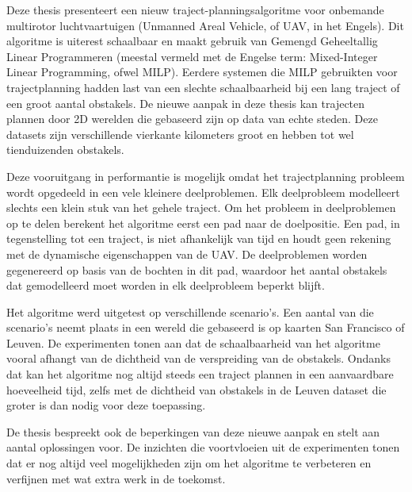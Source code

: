 \documentclass[
master=cws,
masteroption=ai,
english,
]{kulemt}
\begin{document}
\begin{abstract*}
Deze thesis presenteert een nieuw traject-planningsalgoritme voor onbemande multirotor luchtvaartuigen (Unmanned Areal Vehicle, of UAV, in het Engels). Dit algoritme is uiterest schaalbaar en maakt gebruik van Gemengd  Geheeltallig Linear Programmeren (meestal vermeld met de Engelse term: Mixed-Integer Linear Programming, ofwel MILP). Eerdere systemen die MILP gebruikten voor trajectplanning hadden last van een slechte schaalbaarheid bij een lang traject of een groot aantal obstakels. De nieuwe aanpak in deze thesis kan trajecten plannen door 2D werelden die gebaseerd zijn op data van echte steden. Deze datasets zijn verschillende vierkante kilometers groot en hebben tot wel tienduizenden obstakels.
\par
Deze vooruitgang in performantie is mogelijk omdat het trajectplanning probleem wordt opgedeeld in een vele kleinere deelproblemen. Elk deelprobleem modelleert slechts een klein stuk van het gehele traject. Om het probleem in deelproblemen op te delen berekent het algoritme eerst een pad naar de doelpositie. Een pad, in tegenstelling tot een traject, is niet afhankelijk van tijd en houdt geen rekening met de dynamische eigenschappen van de UAV. De deelproblemen worden gegenereerd op basis van de bochten in dit pad, waardoor het aantal obstakels dat gemodelleerd moet worden in elk deelprobleem beperkt blijft.
\par
Het algoritme werd uitgetest op verschillende scenario's. Een aantal van die scenario's neemt plaats in een wereld die gebaseerd is op kaarten San Francisco of Leuven. De experimenten tonen aan dat de schaalbaarheid van het algoritme vooral afhangt van de dichtheid van de verspreiding van de obstakels. Ondanks dat kan het algoritme nog altijd steeds een traject plannen in een aanvaardbare hoeveelheid tijd, zelfs met de dichtheid van obstakels in de Leuven dataset die groter is dan nodig voor deze toepassing.
\par
De thesis bespreekt ook de beperkingen van deze nieuwe aanpak en stelt aan aantal oplossingen voor. De inzichten die voortvloeien uit de experimenten tonen dat er nog altijd veel mogelijkheden zijn om het algoritme te verbeteren en verfijnen met wat extra werk in de toekomst.
\end{abstract*}

\listoffigures
\listoftables

\mainmatter

\clearpage

\clearpage

\clearpage

\clearpage

\clearpage

\clearpage
%

\clearpage

\backmatter



\end{document}
